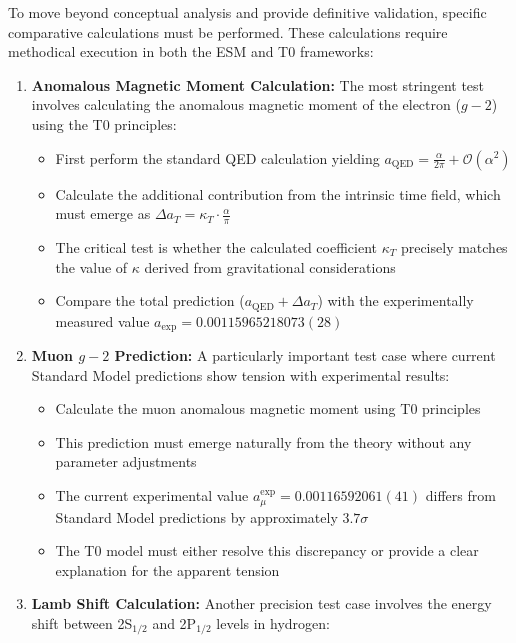 \documentclass[12pt,a4paper]{article}
\begin{document}
	To move beyond conceptual analysis and provide definitive validation, specific comparative calculations must be performed. These calculations require methodical execution in both the ESM and T0 frameworks:
	
	\begin{enumerate}
		\item \textbf{Anomalous Magnetic Moment Calculation:} The most stringent test involves calculating the anomalous magnetic moment of the electron ($g-2$) using the T0 principles:
		
		\begin{itemize}
			\item First perform the standard QED calculation yielding $a_{\text{QED}} = \frac{\alpha}{2\pi} + \mathcal{O}(\alpha^2)$
			\item Calculate the additional contribution from the intrinsic time field, which must emerge as $\Delta a_{T} = \kappa_T \cdot \frac{\alpha}{\pi}$
			\item The critical test is whether the calculated coefficient $\kappa_T$ precisely matches the value of $\kappa$ derived from gravitational considerations
			\item Compare the total prediction ($a_{\text{QED}} + \Delta a_{T}$) with the experimentally measured value $a_{\text{exp}} = 0.00115965218073(28)$ \cite{Hanneke2008}
		\end{itemize}
		
		\item \textbf{Muon $g-2$ Prediction:} A particularly important test case where current Standard Model predictions show tension with experimental results:
		
		\begin{itemize}
			\item Calculate the muon anomalous magnetic moment using T0 principles
			\item This prediction must emerge naturally from the theory without any parameter adjustments
			\item The current experimental value $a_{\mu}^{\text{exp}} = 0.00116592061(41)$ \cite{Muong-2:2021ojo} differs from Standard Model predictions by approximately $3.7\sigma$
			\item The T0 model must either resolve this discrepancy or provide a clear explanation for the apparent tension
		\end{itemize}
		
		\item \textbf{Lamb Shift Calculation:} Another precision test case involves the energy shift between 2S$_{1/2}$ and 2P$_{1/2}$ levels in hydrogen:
		

\end{enumerate}
\end{document}
